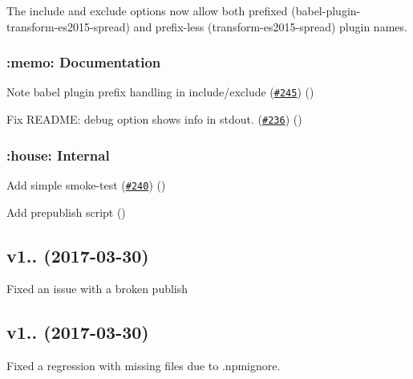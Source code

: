 The {\ttfamily include} and {\ttfamily exclude} options now allow both prefixed ({\ttfamily babel-\/plugin-\/transform-\/es2015-\/spread}) and prefix-\/less ({\ttfamily transform-\/es2015-\/spread}) plugin names.

\subsubsection*{\+:memo\+: Documentation}


\begin{DoxyItemize}
\item Note babel plugin prefix handling in include/exclude (\href{https://github.com/babel/babel-preset-env/pull/245}{\tt \#245}) ()
\item Fix R\+E\+A\+D\+ME\+: debug option shows info in stdout. (\href{https://github.com/babel/babel-preset-env/pull/236}{\tt \#236}) ()
\end{DoxyItemize}

\subsubsection*{\+:house\+: Internal}


\begin{DoxyItemize}
\item Add simple smoke-\/test (\href{https://github.com/babel/babel-preset-env/pull/240}{\tt \#240}) ()
\item Add prepublish script ()
\end{DoxyItemize}

\subsection*{v1.. (2017-\/03-\/30)}


\begin{DoxyItemize}
\item Fixed an issue with a broken publish
\end{DoxyItemize}

\subsection*{v1.. (2017-\/03-\/30)}


\begin{DoxyItemize}
\item Fixed a regression with missing files due to {\ttfamily .npmignore}.
\end{DoxyItemize}

